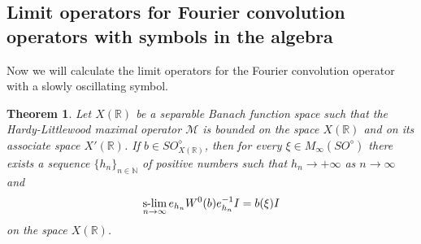\documentclass{birkjour}
\newtheorem{theorem}{Theorem}[section]
\numberwithin{equation}{section}
\newcommand{\N}{\mathbb{N}}
\newcommand{\R}{\mathbb{R}}
\newcommand{\cM}{\mathcal{M}}
\newcommand{\slim}{\operatornamewithlimits{s-\!\lim}_{n\to\infty}}
\begin{document}
\subsection{Limit operators for Fourier convolution operators with symbols
in the algebra \boldmath{$SO_{X(\R)}^\diamond$}}
Now we will calculate the limit operators for the Fourier convolution
operator with a slowly oscillating symbol.
\begin{theorem}\label{th:LO-convolution-SO}
Let $X(\R)$ be a separable Banach function space such that the Hardy-Littlewood
maximal operator $\cM$ is bounded on the space $X(\R)$ and on its associate
space $X'(\R)$. If $b\in SO_{X(\R)}^\diamond$, then for every
$\xi\in M_\infty(SO^\diamond)$ there exists a sequence
$\{h_n\}_{n\in\N}$ of positive numbers such that
$h_n\to+\infty$ as $n\to\infty$ and
\begin{equation}\label{eq:LO-convolution-SO-1}
\slim e_{h_n}W^0(b)e_{h_n}^{-1}I=b(\xi)I
\end{equation}
on the space $X(\R)$.
\end{theorem}
\end{document}
